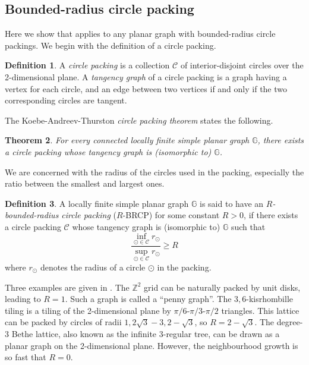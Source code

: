 \documentclass[11pt,a4paper]{amsart}
\newtheorem{theorem}{Theorem}
\theoremstyle{definition}
\newtheorem{definition}[theorem]{Definition}
\theoremstyle{remark}
\begin{document}
\subsection{Bounded-radius circle packing}\label{sec:circle-packing}

Here we show that  applies to any planar graph with bounded-radius circle packings.
We begin with the definition of a circle packing. 
\begin{definition}
A \emph{circle packing} is a collection $\mathcal{C}$ of interior-disjoint circles over the 2-dimensional plane. 
A \emph{tangency graph} of a circle packing is a graph having a vertex for each circle, and an edge between two vertices if and only if the two corresponding circles are tangent. 
\end{definition}

The Koebe-Andreev-Thurston \emph{circle packing theorem} states the following.
\begin{theorem}
For every connected locally finite simple planar graph $\mathbb{G}$, there exists a circle packing whose tangency graph is (isomorphic to) $\mathbb{G}$. 
\end{theorem}

We are concerned with the radius of the circles used in the packing, especially the ratio between the smallest and largest ones. 
\begin{definition}
  A locally finite simple planar graph $\mathbb{G}$ is said to have an \emph{$R$-bounded-radius circle packing} ($R$-BRCP) for some constant $R>0$, if there exists a circle packing $\mathcal{C}$ whose tangency graph is (isomorphic to) $\mathbb{G}$ such that
\[
\frac{\inf\limits_{\odot\in\mathcal{C}}r_{\odot}}{\sup\limits_{\odot\in\mathcal{C}}r_{\odot}}\geq R
\]
where $r_{\odot}$ denotes the radius of a circle $\odot$ in the packing. 
\end{definition}



Three examples are given in . 
The $\mathbb{Z}^2$ grid can be naturally packed by unit disks, leading to $R=1$. 
Such a graph is called a ``penny graph''. 
The $3,6$-kisrhombille tiling is a tiling of the 2-dimensional plane by $\pi/6$-$\pi/3$-$\pi/2$ triangles. 
This lattice can be packed by circles of radii $1,2\sqrt{3}-3,2-\sqrt{3}$, so $R=2-\sqrt{3}$. 
The degree-$3$ Bethe lattice, also known as the infinite $3$-regular tree, can be drawn as a planar graph on the 2-dimensional plane. 
However, the neighbourhood growth is so fast that %
$R=0$. 
\end{document}
